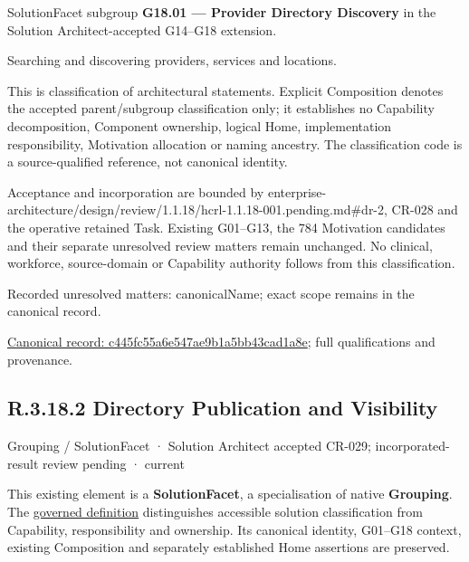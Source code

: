 SolutionFacet subgroup \textbf{G18.01 — Provider Directory Discovery} in the Solution Architect-accepted G14–G18 extension.



Searching and discovering providers, services and locations.



This is classification of architectural statements. Explicit Composition denotes the accepted parent/subgroup classification only; it establishes no Capability decomposition, Component ownership, logical Home, implementation responsibility, Motivation allocation or naming ancestry. The classification code is a source-qualified reference, not canonical identity.



Acceptance and incorporation are bounded by enterprise-architecture/design/review/1.1.18/hcrl-1.1.18-001.pending.md\#dr-2, CR-028 and the operative retained Task. Existing G01–G13, the 784 Motivation candidates and their separate unresolved review matters remain unchanged. No clinical, workforce, source-domain or Capability authority follows from this classification.


{\small Recorded unresolved matters: canonicalName; exact scope remains in the canonical record.}\par
{\footnotesize \href{../../../../../../../continuum/grouping/c445fc55a6e547ae9b1a5bb43cad1a8e.md}{Canonical record: c445fc55a6e547ae9b1a5bb43cad1a8e}; full qualifications and provenance.}\par
\subsection*{R.3.18.2 Directory Publication and Visibility}
\label{navigation:R.3.18.2}

\label{element:b6a20afe29624f73906e5e852d6f2fbf}
{\small Grouping / SolutionFacet · Solution Architect accepted CR-029; incorporated-result review pending · current}\par

This existing element is a \textbf{SolutionFacet}, a specialisation of native
\textbf{Grouping}. The \href{\detokenize{../../../../../../../governance/continuum-representation.md#solutionfacet-classification--1119-candidate}}{governed definition}
distinguishes accessible solution classification from Capability, responsibility
and ownership. Its canonical identity, G01–G18 context, existing Composition
and separately established Home assertions are preserved.



